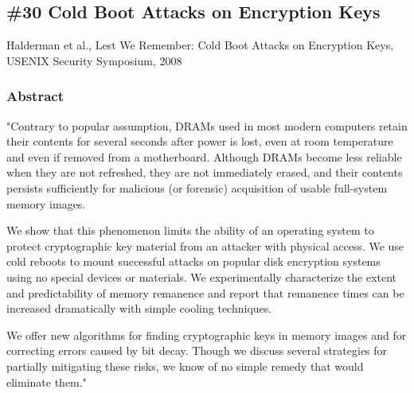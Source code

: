 \subsection*{\#30 Cold Boot Attacks on Encryption Keys}
Halderman et al., Lest We Remember: Cold Boot Attacks on Encryption Keys, USENIX Security Symposium, 2008
\subsubsection{Abstract}
"Contrary to popular assumption, DRAMs used in most modern computers retain their contents for several seconds after power is lost,
even at room temperature and even if removed from a motherboard. Although DRAMs become less reliable when they are not refreshed,
they are not immediately erased, and their contents persists sufficiently for malicious (or forensic) acquisition of usable full-system
memory images.

We show that this phenomenon limits the ability of an operating system to protect cryptographic key material from an attacker
with physical access. We use cold reboots to mount successful attacks on popular disk encryption systems using no special devices or
materials. We experimentally characterize the extent and predictability of memory remanence and report that remanence times can be
increased dramatically with simple cooling techniques.

We offer new algorithms for finding cryptographic keys in memory images and for correcting errors caused by bit decay.
Though we discuss several strategies for partially mitigating these risks, we know of no simple remedy that would eliminate them."

